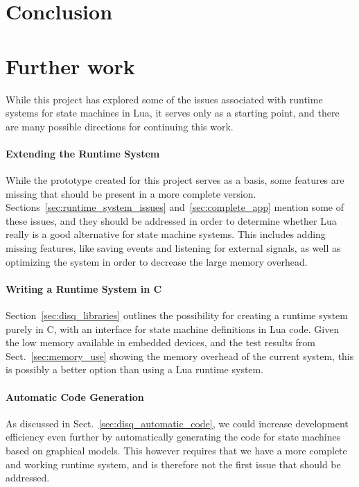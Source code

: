 \section{Conclusion}
\label{sec:conclusion}

\section{Further work}
\label{sec:further_work}
While this project has explored some of the issues associated with runtime systems for state machines in Lua, it serves only as a starting point, and there are many possible directions for continuing this work.

\paragraph{Extending the Runtime System} While the prototype created for this project serves as a basis, some features are missing that should be present in a more complete version. Sections~\ref{sec:runtime_system_issues} and~\ref{sec:complete_app} mention some of these issues, and they should be addressed in order to determine whether Lua really is a good alternative for state machine systems. This includes adding missing features, like saving events and listening for external signals, as well as optimizing the system in order to decrease the large memory overhead.

\paragraph{Writing a Runtime System in C} Section~\ref{sec:disq_libraries} outlines the possibility for creating a runtime system purely in C, with an interface for state machine definitions in Lua code. Given the low memory available in embedded devices, and the test results from Sect.~\ref{sec:memory_use} showing the memory overhead of the current system, this is possibly a better option than using a Lua runtime system.

\paragraph{Automatic Code Generation} As discussed in Sect.~\ref{sec:disq_automatic_code}, we could increase development efficiency even further by automatically generating the code for state machines based on graphical models. This however requires that we have a more complete and working runtime system, and is therefore not the first issue that should be addressed.

